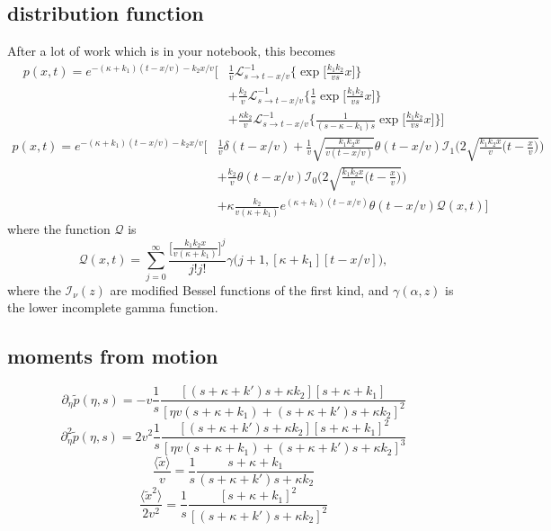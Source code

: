 \documentclass[11pt]{article}
\newcommand\be{\begin{equation}} %
\newcommand\ee{\end{equation}}   %
\newcommand\bra{\langle}
\newcommand\ket{\rangle}
\newcommand\tp{\tilde{p}}
\newcommand\El{\mathcal{L}}
\begin{document}
\subsection{distribution function}
After a lot of work which is in your notebook, this becomes
\begin{align}
p(x,t) = e^{-(\kappa + k_1)(t-x/v)-k_2x/v}
\Big[&\frac{1}{v}\El_{s\rightarrow t-x/v}^{-1}\Big\{\exp\Big[\frac{k_1k_2}{vs}x\Big]\Big\} \\
&+ \frac{k_2}{v}\El_{s\rightarrow t-x/v}^{-1}\Big\{\frac{1}{s}\exp\Big[\frac{k_1k_2}{vs}x\Big]\Big\} \\
&+ \frac{\kappa k_2}{v}\El_{s\rightarrow t-x/v}^{-1}\Big\{\frac{1}{(s-\kappa-k_1)s}\exp\Big[\frac{k_1k_2}{vs}x\Big]\Big\}\Big]
\end{align}
\begin{align}
p(x,t) = e^{-(\kappa + k_1)(t-x/v)-k_2x/v}
\Bigg[&\frac{1}{v}\delta(t-x/v) + \frac{1}{v}\sqrt{\frac{k_1k_2x}{v(t-x/v)}}\theta(t-x/v)\mathcal{I}_1\Bigg(2\sqrt{\frac{k_1k_2x}{v}\Big(t-\frac{x}{v}\Big)}\Bigg)\\
&+\frac{k_2}{v}\theta(t-x/v)\mathcal{I}_0\Bigg(2\sqrt{\frac{k_1k_2x}{v}\Big(t-\frac{x}{v}\Big)}\Bigg)\\
&+ \kappa\frac{ k_2}{v(\kappa+k_1)}e^{(\kappa+k_1)(t-x/v)}\theta(t-x/v)\mathcal{Q}(x,t)\Bigg]
\end{align}
where the function $\mathcal{Q}$ is
\be \mathcal{Q}(x,t) = \sum_{j=0}^\infty \frac{\big[\frac{k_1k_2x}{v(\kappa+k_1)}\big]^j}{j!j!} \gamma\big(j+1,[\kappa+k_1][t-x/v]\big),\ee
where the $\mathcal{I}_\nu(z)$ are modified Bessel functions of the first kind, and $\gamma(\alpha,z)$ is the lower incomplete gamma function.

\subsection{moments from motion}
\be \partial_\eta \tp(\eta,s) = -v \frac{1}{s}\frac{[(s+\kappa + k')s + \kappa k_2][s+\kappa + k_1]}{[\eta v(s+\kappa +k_1) + (s+ \kappa + k')s+\kappa k_2]^2}\ee
\be \partial_\eta^2 \tp(\eta,s) = 2v^2 \frac{1}{s} \frac{[(s+\kappa + k')s+\kappa k_2][s+\kappa + k_1]^2}{[\eta v(s+\kappa + k_1) + (s+\kappa + k')s+ \kappa k_2]^3}\ee
\be  \frac{\bra\tilde{x}\ket} {v} = \frac{1}{s}\frac{s+\kappa + k_1}{(s+\kappa + k')s + \kappa k_2}\ee
\be \frac{\bra \tilde{x}^2 \ket}{2v^2} = \frac{1}{s} \frac{[s+\kappa + k_1]^2}{[(s+\kappa + k')s + \kappa k_2]^2} \ee
\end{document}
